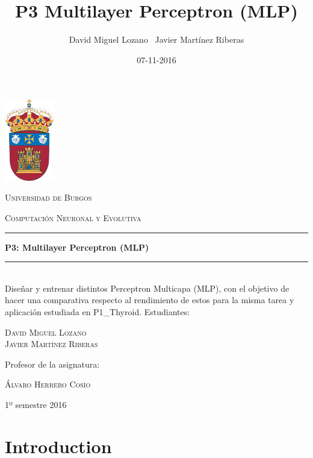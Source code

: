 \documentclass[a4paper,12pt,titlepage]{article}
\newcommand{\HRule}[1]{\rule{\linewidth}{#1}}
\begin{document}
\author{David Miguel Lozano \ Javier Martínez Riberas}
\title{P3 Multilayer Perceptron (MLP)}
\date{07-11-2016}

\begin{titlepage}
	\centering
	\includegraphics[width=0.16\textwidth]{ubu-logo.png}\par
	\vspace{0.3cm}
	{\scshape\LARGE Universidad de Burgos \par}
	\vfill
	{\scshape\Large Computación Neuronal y Evolutiva \par}
	\HRule{2pt}
	{\huge\bfseries P3: Multilayer Perceptron (MLP) \par}
	\HRule{2pt}
	\\ [0.5cm]
	{Diseñar y entrenar distintos Perceptron Multicapa (MLP), con el objetivo de hacer una comparativa respecto al rendimiento de estos para la misma tarea y aplicación estudiada en P1\_Thyroid.}
	\vfill
	Estudiantes:\par
	{\Large\scshape David Miguel Lozano \\ Javier Martínez Riberas \par}
	\vfill
	Profesor de la asignatura:\par
	\textsc{Álvaro Herrero Cosío}
	\vfill
	{\large 1º semestre 2016 \par}
\end{titlepage}

\newpage
\tableofcontents
\begin{appendix}
\end{appendix}

\newpage

\section{Introduction}
\end{document}
